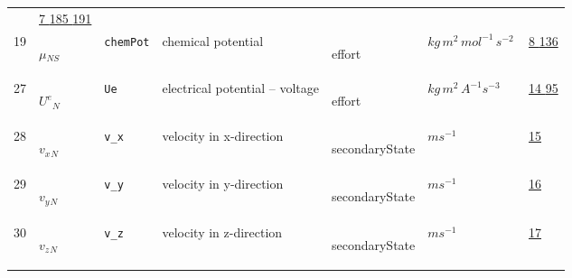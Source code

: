 \begin{longtable}{|p{1cm}|p{2.5cm}|p{4.5cm}|p{8cm}|p{3.0cm}|p{3cm}|p{1cm}|}
             &                 \hyperlink{"e:7"}{ 7 }
                                 \hyperlink{"e:185"}{ 185 }
                                 \hyperlink{"e:191"}{ 191 }
                 \\
            19
             & \hypertarget{"v:19"}{ $ {\mu}{_{{N S}}} $}
             & \verb|chemPot|
             & chemical potential
             & \begin{lay}effort \end{lay}
             & $ kg \,m^{2} \,mol^{-1} \,s^{-2} \, $
             &                 \hyperlink{"e:8"}{ 8 }
                                 \hyperlink{"e:136"}{ 136 }
                 \\
            27
             & \hypertarget{"v:27"}{ $ {{U^e}}{_{N}} $}
             & \verb|Ue|
             & electrical potential -- voltage
             & \begin{lay}effort \end{lay}
             & $ kg \,m^{2} \,A^{-1} s^{-3} \, $
             &                 \hyperlink{"e:14"}{ 14 }
                                 \hyperlink{"e:95"}{ 95 }
                 \\
            28
             & \hypertarget{"v:28"}{ $ {{v_x}}{_{N}} $}
             & \verb|v_x|
             & velocity in x-direction
             & \begin{lay}secondaryState \end{lay}
             & $ m s^{-1} \, $
             &                 \hyperlink{"e:15"}{ 15 }
                 \\
            29
             & \hypertarget{"v:29"}{ $ {{v_y}}{_{N}} $}
             & \verb|v_y|
             & velocity in y-direction
             & \begin{lay}secondaryState \end{lay}
             & $ m s^{-1} \, $
             &                 \hyperlink{"e:16"}{ 16 }
                 \\
            30
             & \hypertarget{"v:30"}{ $ {{v_z}}{_{N}} $}
             & \verb|v_z|
             & velocity in z-direction
             & \begin{lay}secondaryState \end{lay}
             & $ m s^{-1} \, $
             &                 \hyperlink{"e:17"}{ 17 }
                 \\
    \end{longtable}